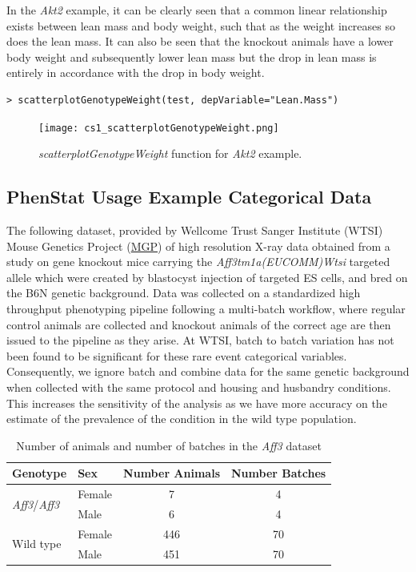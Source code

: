 \documentclass[12pt,a4paper]{article}
\begin{document}
In the \textit{Akt2} example, it can be clearly seen that a common linear relationship exists between lean mass and body weight, such that as the weight increases so does the lean mass. 
It can also be seen that the knockout animals have a lower body weight and subsequently lower lean mass but the drop in lean mass is entirely in accordance with the drop in body weight. 

\begingroup
    \fontsize{8pt}{12pt}\selectfont
\begin{verbatim}
> scatterplotGenotypeWeight(test, depVariable="Lean.Mass")
\end{verbatim}
\endgroup 

\begin{figure}[H]%
\centerline{\texttt{[image: cs1\_scatterplotGenotypeWeight.png]}}
\caption{\textit{scatterplotGenotypeWeight} function for \textit{Akt2} example.}\label{fig:23}
\end{figure}

\subsection{PhenStat Usage Example Categorical Data}
The following dataset, provided by Wellcome Trust Sanger Institute (WTSI) Mouse Genetics Project (\href{http://www.sanger.ac.uk/resources/mouse/}{MGP}) of high resolution X-ray data obtained from 
a study on gene knockout mice carrying the \textit{Aff3tm1a(EUCOMM)Wtsi} targeted allele which were created by blastocyst injection of targeted ES cells, and bred on the B6N genetic background. 
Data was collected on a standardized high throughput phenotyping pipeline following a multi-batch workflow, where regular control animals are collected and knockout animals of the correct age are then issued to the pipeline as they arise. 
At WTSI, batch to batch variation has not been found to be significant for these rare event categorical variables. 
Consequently, we ignore batch and combine data for the same genetic background when collected with the same protocol and housing and husbandry conditions. 
This increases the sensitivity of the analysis as we have more accuracy on the estimate of the prevalence of the condition in the wild type population.

\begin{table}[!h]
\begin{center}
\begin{tabular}{| l | l | c | c |}
  \hline
Genotype&Sex&Number Animals&Number Batches\\\hline
\multirow{2}{*}{\textit{Aff3}\slash \textit{Aff3}}&Female&7&4\\
			    &Male&6&4\\
			    \hline
\multirow{2}{*}{Wild type}&Female&446&70\\
			    &Male&451&70\\

\hline  
\end{tabular}
\caption{Number of animals and number of batches in the \textit{Aff3} dataset}\label{table:09}
\end{center}
\end{table}
\end{document}

